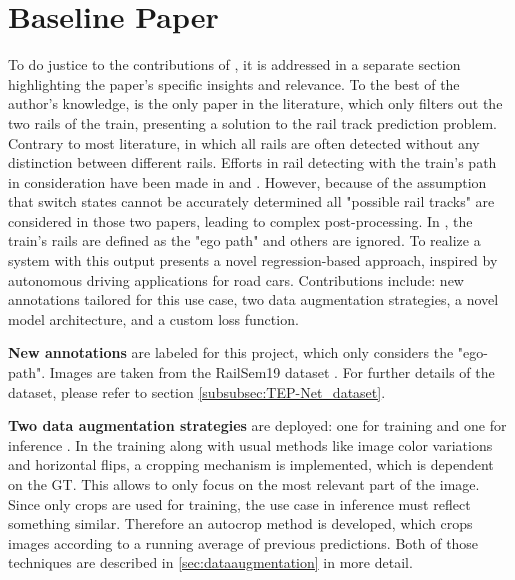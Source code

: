 \section{Baseline Paper}
\label{sec:baselinepaper}

To do justice to the contributions of \cite{tepNet2024}, it is addressed in a separate section highlighting the paper's specific insights and relevance. 
To the best of the author's knowledge, \cite{tepNet2024} is the only paper in the literature, which only filters out the two rails of the train, presenting a solution to the rail track prediction problem.
Contrary to most literature, in which all rails are often detected without any distinction between different rails.
Efforts in rail detecting with the train's path in consideration have been made in \cite{RailraodSemanticPossibleTracks2020} and \cite{TPENet2023}.
However, because of the assumption that switch states cannot be accurately determined all "possible rail tracks" are considered in those two papers, leading to complex post-processing.
In \cite{tepNet2024}, the train's rails are defined as the "ego path" and others are ignored.
To realize a system with this output \cite{tepNet2024} presents a novel regression-based approach, inspired by autonomous driving applications for road cars.
Contributions include: new annotations tailored for this use case, two data augmentation strategies, a novel model architecture, and a custom loss function.

\vspace{1cm} %

\noindent \textbf{New annotations} are labeled for this project, which only considers the "ego-path".
Images are taken from the RailSem19 dataset \cite{tepNet2024}.
For further details of the dataset, please refer to section \ref{subsubsec:TEP-Net_dataset}.

\vspace{1cm} %

\noindent \textbf{Two data augmentation strategies} are deployed: one for training and one for inference \cite{tepNet2024}.
In the training along with usual methods like image color variations and horizontal flips, a cropping mechanism is implemented, which is dependent on the \ac{GT}.
This allows to only focus on the most relevant part of the image.
Since only crops are used for training, the use case in inference must reflect something similar.
Therefore an autocrop method is developed, which crops images according to a running average of previous predictions.
Both of those techniques are described in \autoref{sec:dataaugmentation} in more detail.

